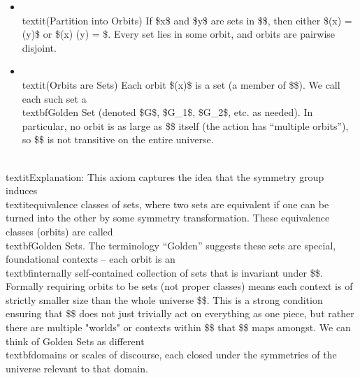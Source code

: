 \documentclass[11pt]{article}
\begin{document}
\begin{itemize}
  \item \\textit{(Partition into Orbits)} If \$x\$ and \$y\$ are sets in \$\infty\$, then either \$\Orb(x) = \Orb(y)\$ or \$\Orb(x) \cap \Orb(y) = \emptyset\$. Every set lies in some orbit, and orbits are pairwise disjoint.
  \item \\textit{(Orbits are Sets)} Each orbit \$\Orb(x)\$ is a set (a member of \$\infty\$). We call each such set a \\textbf{Golden Set} (denoted \$G\$, \$G\_1\$, \$G\_2\$, etc. as needed). In particular, no orbit is as large as \$\infty\$ itself (the action has “multiple orbits”), so \$\Sym\$ is not transitive on the entire universe.

\end{itemize}
    \\textit{Explanation:} This axiom captures the idea that the symmetry group induces \\textit{equivalence classes} of sets, where two sets are equivalent if one can be turned into the other by some symmetry transformation. These equivalence classes (orbits) are called \\textbf{Golden Sets}. The terminology “Golden” suggests these sets are special, foundational contexts – each orbit is an \\textbf{internally self-contained collection} of sets that is invariant under \$\Sym\$. Formally requiring orbits to be sets (not proper classes) means each context is of strictly smaller size than the whole universe \$\infty\$. This is a strong condition ensuring that \$\Sym\$ does not just trivially act on everything as one piece, but rather there are multiple "worlds" or contexts within \$\infty\$ that \$\Sym\$ maps amongst. We can think of Golden Sets as different \\textbf{domains or scales of discourse}, each closed under the symmetries of the universe relevant to that domain.
\end{document}
